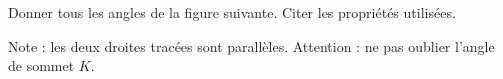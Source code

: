 
\begin{exercice}\label{exo2smath-0160}

    Donner tous les angles de la figure suivante. Citer les propriétés utilisées.
\begin{center}

\end{center}
Note : les deux droites tracées sont parallèles. Attention : ne pas oublier l'angle de sommet \( K\).

\end{exercice}

